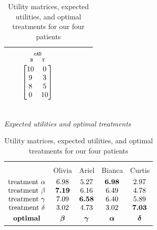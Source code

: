 \documentclass[utf8]{FrontiersinHarvard} %
\renewcommand*{\|}[1][]{\nonscript\:#1\vert\nonscript\:\mathopen{}}
\newcommand*{\cad}{\texttt{cAD}}
\newcommand*{\yes}{\texttt{Y}}
\newcommand*{\no}{\texttt{N}}
\begin{document}
\begin{table}[!h]
\begin{tabular}{lccccccc}
    &&
    $\begin{gathered}
      {\scriptstyle\cad}\\[-2\jot]
      \begin{smallmatrix}
        \no\enspace &\enspace\yes
      \end{smallmatrix}\\[-\jot]
      \begin{bmatrix}10&0\\9&3\\8&5\\0&10\end{bmatrix}\end{gathered}$
    \\[6\jot]
    \hline
  \end{tabular}
\\[1em]
  \textit{Expected utilities and optimal treatments}\\
  \begin{tabular}{lcccc}
    \hline\\[-1.5\jot]
    &{\small Olivia} &{\small Ariel} &{\small Bianca} &{\small Curtis}
    \\[\jot]
    $\begin{matrix}
      \text{treatment }\alpha\\ 
      \text{treatment }\beta\\ 
      \text{treatment }\gamma\\ 
      \text{treatment }\delta\\[\jot]
      \textbf{optimal}
    \end{matrix}$
    &
    $\begin{matrix}6.98\\\bm{7.19}\\7.09\\3.02\\[\jot]\bm{\beta}\end{matrix}$
    &
    $\begin{matrix}5.27\\6.16\\\bm{6.58}\\4.73\\[\jot]\bm{\gamma}\end{matrix}$
    &
    $\begin{matrix}\bm{6.98}\\6.49\\6.40\\3.02\\[\jot]\bm{\alpha}\end{matrix}$
    &
    $\begin{matrix}2.97\\4.78\\5.89\\\bm{7.03}\\[\jot]\bm{\delta}\end{matrix}$
    \\[5\jot]
    \hline
  \end{tabular}
  \caption{Utility matrices, expected utilities, and optimal treatments for our four patients}\label{tab:utilities_patients}
\end{table}
\end{document}
